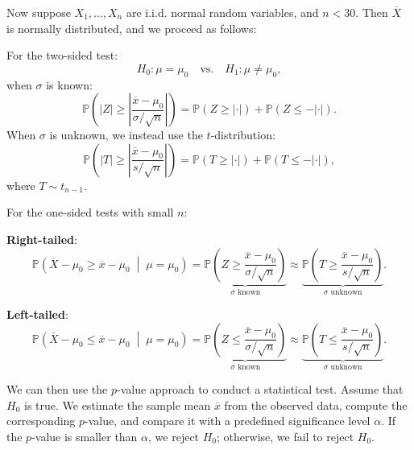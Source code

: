 Now suppose \(X_1, \dots, X_n\) are i.i.d. normal random variables, and \(n < 30\). Then \(\overline{X}\) is normally distributed, and we proceed as follows:

For the two-sided test:
\[
  H_0: \mu = \mu_0 \quad \text{vs.} \quad H_1: \mu \neq \mu_0,
\]
when \(\sigma\) is known:
\[
  \mathbb{P}\left( \left| Z \right| \geq \left| \frac{\overline{x} - \mu_0}{\sigma / \sqrt{n}} \right| \right) = \mathbb{P}\left( Z \geq \left| \cdot \right| \right) + \mathbb{P}\left( Z \leq -\left| \cdot \right| \right).
\]
When \(\sigma\) is unknown, we instead use the \(t\)-distribution:
\[
  \mathbb{P}\left( \left| T \right| \geq \left| \frac{\overline{x} - \mu_0}{s / \sqrt{n}} \right| \right) = \mathbb{P}\left( T \geq \left| \cdot \right| \right) + \mathbb{P}\left( T \leq -\left| \cdot \right| \right),
\]
where \(T \sim t_{n-1}\).

For the one-sided tests with small \(n\):

\textbf{Right-tailed}:
\[
  \mathbb{P}\left( \overline{X} - \mu_0 \geq \overline{x} - \mu_0 \;\middle|\; \mu = \mu_0 \right) = 
  \underbrace{ \mathbb{P}\left( Z \geq \frac{\overline{x} - \mu_0}{\sigma / \sqrt{n}} \right) }_{\sigma \text{ known}} 
  \approx \underbrace{ \mathbb{P}\left( T \geq \frac{\overline{x} - \mu_0}{s / \sqrt{n}} \right) }_{\sigma \text{ unknown}}.
\]

\textbf{Left-tailed}:
\[
  \mathbb{P}\left( \overline{X} - \mu_0 \leq \overline{x} - \mu_0 \;\middle|\; \mu = \mu_0 \right) = 
  \underbrace{ \mathbb{P}\left( Z \leq \frac{\overline{x} - \mu_0}{\sigma / \sqrt{n}} \right) }_{\sigma \text{ known}} 
  \approx \underbrace{ \mathbb{P}\left( T \leq \frac{\overline{x} - \mu_0}{s / \sqrt{n}} \right) }_{\sigma \text{ unknown}}.
\]

We can then use the \(p\)-value approach to conduct a statistical test. Assume that \(H_0\) is true. We estimate the sample mean \(\overline{x}\) from the observed data, compute the corresponding \(p\)-value, and compare it with a predefined significance level \(\alpha\). If the \(p\)-value is smaller than \(\alpha\), we reject \(H_0\); otherwise, we fail to reject \(H_0\).

